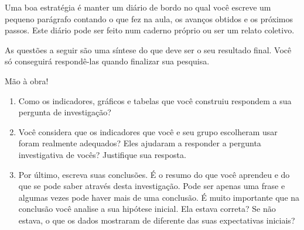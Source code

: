 Uma boa estratégia é manter um diário de bordo no qual você escreve um pequeno parágrafo contando o que fez na aula, os avanços obtidos e os próximos passos. Este diário pode ser feito num caderno próprio ou ser um relato coletivo. 

As questões a seguir são uma síntese do que deve ser o seu resultado final. Você só conseguirá respondê-las quando finalizar sua pesquisa.

Mão à obra!

\begin{enumerate}
\item Como os indicadores, gráficos e tabelas que você construiu respondem a sua pergunta de investigação?
\item Você considera que os indicadores que você e seu grupo escolheram usar foram realmente adequados? Eles ajudaram a responder a pergunta investigativa de vocês? Justifique sua resposta.
\item Por último, escreva suas conclusões. É o resumo do que você aprendeu e do que se pode saber através desta investigação. Pode ser apenas uma frase e algumas vezes pode haver mais de uma conclusão. É muito importante que na conclusão você analise a sua hipótese inicial. Ela estava correta? Se não estava, o que os dados mostraram de diferente das suas expectativas iniciais?
\end{enumerate}

